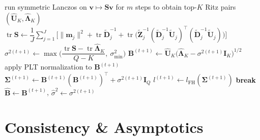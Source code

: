 \begin{algorithm}[htbp]
\begin{algorithmic}[1]
    \State run symmetric Lanczos on $\mathbf v\mapsto\mathbf S\mathbf v$ for $m$ steps to obtain top-$K$ Ritz pairs $(\hat{\mathbf U}_K,\hat{\bm\Lambda}_K)$
    \State $\operatorname{tr}\mathbf S \gets \dfrac{1}{J}\displaystyle\sum_{j=1}^{J}\Big[\|\mathbf m_j\|^2 + \operatorname{tr}\tilde{\mathbf D}_j^{-1} + \operatorname{tr}\Big(\tilde{\mathbf Z}_j^{-1}(\tilde{\mathbf D}_j^{-1}\tilde{\mathbf U}_j)^\top(\tilde{\mathbf D}_j^{-1}\tilde{\mathbf U}_j)\Big)\Big]$
    \State $\sigma^{2(t+1)} \gets \max\Big(\dfrac{\operatorname{tr}\mathbf S - \operatorname{tr}\hat{\bm\Lambda}_K}{Q-K},\ \sigma^2_{\min}\Big)$
    \State $\mathbf{B}^{(t+1)} \gets \hat{\mathbf U}_K\big(\hat{\bm\Lambda}_K - \sigma^{2(t+1)}\mathbf I_K\big)^{1/2}$
    \State apply PLT normalization to $\mathbf{B}^{(t+1)}$
    \State $\bm{\Sigma}^{(t+1)} \gets \mathbf{B}^{(t+1)}(\mathbf{B}^{(t+1)})^{\top} + \sigma^{2(t+1)}\mathbf{I}_Q$
    \State $l^{(t+1)} \gets l_{\text{FH}}(\bm{\Sigma}^{(t+1)})$
    \State \textbf{break}
    \EndIf
\EndFor
\State \Return $\hat{\mathbf{B}} \gets \mathbf{B}^{(t+1)}$, $\hat\sigma^2 \gets \sigma^{2(t+1)}$
\end{algorithmic}
\end{algorithm}

\section{Consistency \& Asymptotics}
\label{sec:asymptotical-properties}
